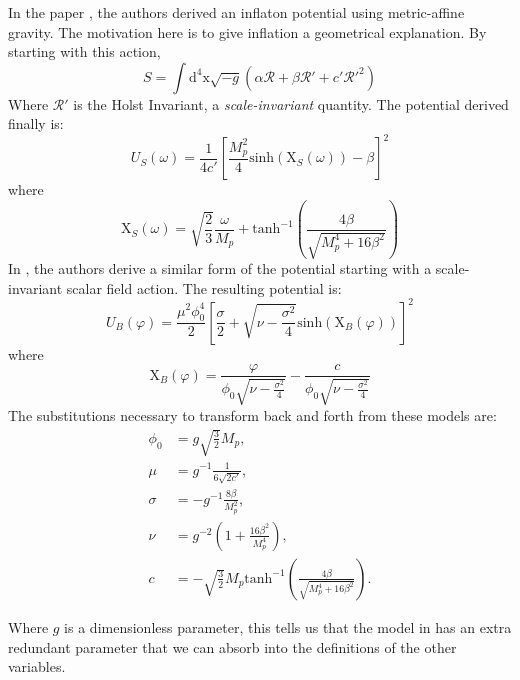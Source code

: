 \documentclass[aps,prd,reprint,preprintnumbers,showpacs,floatfix,nofootinbib,superscript address]{revtex4-2}
\begin{document}
In the paper \cite{Salvio_2022}, the authors derived an inflaton potential using metric-affine gravity. The motivation here is to give inflation a geometrical explanation. 
By starting with this action, 
\begin{equation}
    S = \int \text{d}^4\text{x} \sqrt{-g} (\alpha \mathcal{R} + \beta \mathcal{R}' + c' \mathcal{R}'^{2})
\end{equation}
Where $\mathcal{R}'$ is the Holst Invariant, a \textit{scale-invariant} quantity. The potential derived finally is: 
\begin{equation}
    U_S(\omega) = \frac{1}{4 c'} \left[ \frac{M_{p}^{2}}{4} \text{sinh}(\text{X}_S(\omega)) - \beta  \right]^2
\end{equation}
where
\begin{equation}
    \text{X}_S(\omega) = \sqrt{\frac{2}{3}} \frac{\omega}{M_{p}} + \text{tanh}^{-1} \left(\frac{4 \beta}{\sqrt{M_{p}^{4}+16 \beta^2}} \right)
\end{equation}
In \cite{barker2024poincaregaugetheoryconformal}, the authors derive a similar form of the potential starting with a scale-invariant scalar field action. The resulting potential is:
\begin{equation}
    U_B(\varphi) = \frac{\mu^2 \phi_{0}^{4}}{2} \left[ \frac{\sigma}{2} + \sqrt{\nu - \frac{\sigma^2}{4}} \text{sinh}\left( \text{X}_B(\varphi) \right)  \right]^2
\end{equation}
where
\begin{equation}
    \text{X}_B(\varphi) =  \frac{\varphi}{\phi_0 \sqrt{\nu - \frac{\sigma^2}{4}}} - \frac{c}{\phi_0 \sqrt{\nu - \frac{\sigma^2}{4}}}
\end{equation}
The substitutions necessary to transform back and forth from these models are: 
\begin{subequations}
    \begin{align}
    \phi_0 &= g \sqrt{\frac{3}{2}} M_p , \\
    \mu &= g^{-1} \frac{1}{6 \sqrt{2 c'}}, \\
    \sigma &= - g^{-1} \frac{8 \beta}{M_{p}^{2}} , \\
    \nu &= g^{-2} \left( 1 + \frac{16 \beta^2}{M_{p}^{4}} \right) , \\
    c  &= -\sqrt{\frac{3}{2}} M_{p} \text{tanh}^{-1} \left(\frac{4 \beta}{\sqrt{M_{p}^{4}+16 \beta^2}} \right).
\end{align}
\end{subequations}

Where $g$ is a dimensionless parameter, this tells us that the model in \cite{barker2024poincaregaugetheoryconformal} has an extra redundant parameter that we can absorb into the definitions of the other variables.
\end{document}
